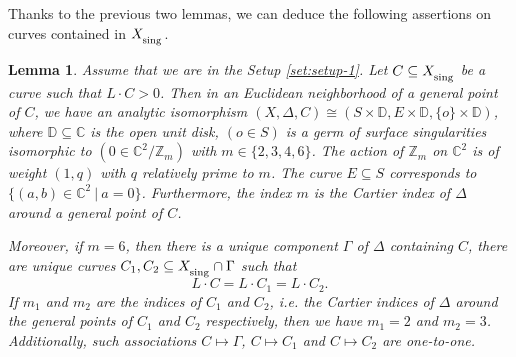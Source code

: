 \documentclass[12pt]{amsart}
\newcommand{\<}{\leq}
\newcommand{\D}{\Delta}
\newtheorem{lemma}[theorem]{Lemma}
\theoremstyle{remark}
\theoremstyle{definition}
\theoremstyle{definition}
\numberwithin{equation}{section}
\theoremstyle{definition}
\theoremstyle{definition}
\def\sing{\operatorname{\textsubscript{\rm sing}}}
\begin{document}
Thanks to the previous two lemmas, we can deduce the following assertions on curves contained in $X_{\sing}$. 


\begin{lemma}
\label{lemma:singularities-are-cyclic-1}
Assume that we are in the Setup \ref{set:setup-1}. 
Let $C\subseteq X_{\sing}$ be a curve such that $L\cdot C >0$. 
Then in an Euclidean neighborhood of a general point of  $C$, we have an analytic isomorphism $(X,\Delta, C)\cong (S\times \mathbb{D}, E\times \mathbb{D},  \{o\}\times \mathbb{D})$, 
where $\mathbb{D} \subseteq \mathbb{C}$ is the open unit disk, $(o\in S)$ is a germ of surface singularities isomorphic to $(0\in \mathbb{C}^2/\mathbb{Z}_m)$ with $m\in \{2,3,4,6\}$.  
The action of $\mathbb{Z}_m$ on $\mathbb{C}^2$ is of weight $(1,q)$ with $q$ relatively prime to $m$. 
The curve $E\subseteq S$ corresponds to $\{(a,b)\in \mathbb{C}^2 \ |\ a=0 \}$. 
Furthermore, the index $m$ is the  Cartier index of $\Delta$ around a general point of $C$. 

Moreover, if $m=6$, then there is a unique component $\Gamma$ of $\D$ containing $C$, there are unique curves $C_1, C_2 \subseteq X_\textsubscript{\rm sing} \cap \Gamma$  such that 
\[
L\cdot C =L\cdot C_1 = L\cdot C_2. 
\] 
If $m_1$ and $m_2$ are the indices of $C_1$ and $C_2$, i.e. the Cartier indices of $\Delta$ around the general points of $C_1$ and $C_2$ respectively, then we have $m_1=2$ and $m_2=3$. 
Additionally, such associations $C \mapsto \Gamma$, $C \mapsto C_1$ and $C\mapsto C_2$ are one-to-one. 
\end{lemma} 
\end{document}
